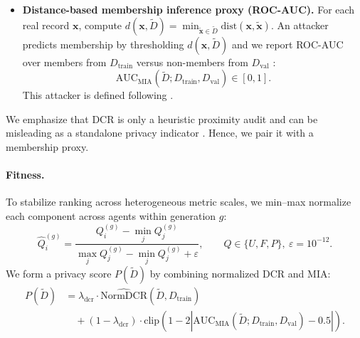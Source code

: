 \documentclass[preprint,12pt]{elsarticle}
\begin{document}
\begin{itemize}
    \begin{equation}
    \mathrm{NormDCR}(\tilde{D},D_{\text{train}})=
    \frac{\mathrm{DCR}_{q}(\tilde{D},D_{\text{train}})}{\mathrm{DCR}_{q}^{\mathrm{LOO}}(D_{\text{train}})+\varepsilon},
    \qquad \varepsilon=10^{-12}.
    \label{eq:normdcr}
    \end{equation}
    To prevent runaway NormDCR values from dominating fitness at the expense of distributional fidelity, we apply a saturation cap of $\mathrm{NormDCR}_{\max}=3.0$ before the privacy score computation. The values above this threshold indicate that synthetic samples are too diffuse relative to the real data geometry, which provides no additional privacy benefit. We use $\mathrm{NormDCR}$ for in-loop selection, and for transparency, we report DCR in Section~\ref{sec:results} on the evaluation scale used in the figures and tables.
    \item \textbf{Distance-based membership inference proxy (ROC-AUC).} For each real record $\mathbf{x}$, compute $d(\mathbf{x},\tilde{D})=\min_{\tilde{\mathbf{x}}\in \tilde{D}}\mathrm{dist}(\mathbf{x},\tilde{\mathbf{x}})$. An attacker predicts membership by thresholding $d(\mathbf{x},\tilde{D})$ and we report ROC-AUC over members from $D_{\text{train}}$ versus non-members from $D_{\text{val}}$ \cite{Hayes2019}:
    \begin{equation}
    \mathrm{AUC}_{\mathrm{MIA}}(\tilde{D};D_{\text{train}},D_{\text{val}})\in[0,1].
    \end{equation}
    This attacker is defined following \cite{Hayes2019,ZhangMalin2022}.
\end{itemize}
We emphasize that DCR is only a heuristic proximity audit and can be misleading as a standalone privacy indicator \cite{yao2025dcr_delusion}. Hence, we pair it with a membership proxy.

\paragraph{Fitness.}
To stabilize ranking across heterogeneous metric scales, we min--max normalize each component across agents within generation $g$:
\begin{equation}
\hat{Q}_i^{(g)}=\frac{Q_i^{(g)}-\min_j Q_j^{(g)}}{\max_j Q_j^{(g)}-\min_j Q_j^{(g)}+\varepsilon},\qquad Q\in\{U,F,P\},\ \varepsilon=10^{-12}.
\label{eq:minmax}
\end{equation}
We form a privacy score $P(\tilde{D})$ by combining normalized DCR and MIA:
\begin{equation}
\begin{aligned}
P(\tilde{D}) &= \lambda_{\mathrm{dcr}}\cdot \widehat{\mathrm{NormDCR}}(\tilde{D},D_{\text{train}}) \\
&\quad + (1-\lambda_{\mathrm{dcr}})\cdot \mathrm{clip}\!\left(
1 - 2\left|\mathrm{AUC}_{\mathrm{MIA}}(\tilde{D};D_{\text{train}},D_{\text{val}}) - 0.5\right|
\right).
\end{aligned}
\end{equation}
\end{document}

